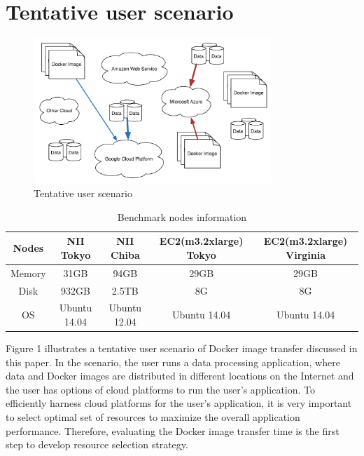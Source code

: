 \documentclass{ieicej}
\begin{document}
\section{Tentative user scenario}


\begin{figure}
  \begin{center}
  \includegraphics[width=0.8\textwidth,natwidth=1000,natheight=450]{1_Tentative_user_scenario.pdf}
  \end{center}
  \caption{Tentative user scenario}
  \label{tentative_user_scenario}
\end{figure}


\begin{table}[t]
  \begin{center}
  \begin{tabular}{| c | c | c | c | c |}
  \hline
    Nodes   & NII Tokyo    & NII Chiba        & EC2(m3.2xlarge) Tokyo    & EC2(m3.2xlarge) Virginia \\
  \hline
    Memory  & 31GB         &  94GB            & 29GB                     &  29GB \\
  \hline
    Disk    & 932GB        &  2.5TB           & 8G                       &  8G \\
  \hline
    OS      & Ubuntu 14.04 &  Ubuntu 12.04    & Ubuntu 14.04             & Ubuntu 14.04 \\
  \hline
  \end{tabular}
  \caption{Benchmark nodes information}
  \label{bench_nodes_info}
  \end{center}
\end{table}

Figure 1 illustrates a tentative user scenario of Docker image transfer discussed in this paper. In the scenario, the user runs a data processing application, where data and Docker images are distributed in different locations on the Internet and the user has options of cloud platforms to run the user's application. To efficiently harness cloud platforms for the user's application, it is very important to select optimal set of resources to maximize the overall application performance. Therefore, evaluating the Docker image transfer time is the first step to develop resource selection strategy.
\end{document}
